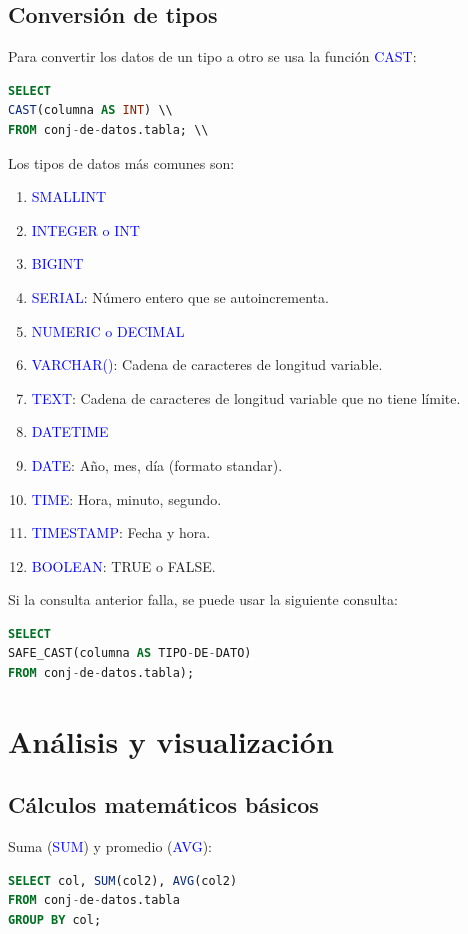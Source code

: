 \documentclass[a4paper, 12pt]{book}
\begin{document}
\subsection{Conversión de tipos}
Para convertir los datos de un tipo a otro se usa la función \textcolor{blue}{CAST}:
\begin{lstlisting}[language=SQL]
SELECT
CAST(columna AS INT) \\
FROM conj-de-datos.tabla; \\
\end{lstlisting}
Los tipos de datos más comunes son:
\begin{enumerate}
\item \textcolor{blue}{SMALLINT}
\item \textcolor{blue}{INTEGER o INT}
\item \textcolor{blue}{BIGINT}
\item \textcolor{blue}{SERIAL}: Número entero que se autoincrementa.
\item \textcolor{blue}{NUMERIC o DECIMAL}
\item \textcolor{blue}{VARCHAR()}: Cadena de caracteres de longitud variable.
\item \textcolor{blue}{TEXT}: Cadena de caracteres de longitud variable que no tiene límite.
\item \textcolor{blue}{DATETIME}
\item \textcolor{blue}{DATE}: Año, mes, día (formato standar).
\item \textcolor{blue}{TIME}: Hora, minuto, segundo.
\item \textcolor{blue}{TIMESTAMP}: Fecha y hora.
\item \textcolor{blue}{BOOLEAN}: TRUE o FALSE.
\end{enumerate}
Si la consulta anterior falla, se puede usar la siguiente consulta:
\begin{lstlisting}[language=SQL]
SELECT
SAFE_CAST(columna AS TIPO-DE-DATO)
FROM conj-de-datos.tabla);
\end{lstlisting}
\section{Análisis y visualización}
\subsection{Cálculos matemáticos básicos}
Suma (\textcolor{blue}{SUM}) y promedio (\textcolor{blue}{AVG}):
\begin{lstlisting}[language=SQL]
SELECT col, SUM(col2), AVG(col2)
FROM conj-de-datos.tabla
GROUP BY col;
\end{lstlisting}
\end{document}

